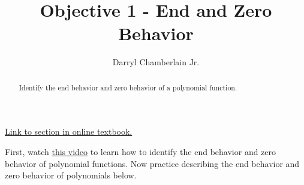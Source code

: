 \documentclass{ximera}
\author{Darryl Chamberlain Jr.}
\title{Objective 1 - End and Zero Behavior}
\begin{document}
\begin{abstract}
Identify the end behavior and zero behavior of a polynomial function.
\end{abstract}
\maketitle

\href{https://cnx.org/contents/mwjClAV_@8.1:ZE9qk3Qp@12/Graphs-of-Polynomial-Functions}{Link to section in online textbook.}


First, watch \underline{\href{https://mediasite.video.ufl.edu/Mediasite/Play/8814f4cd9bc24a2ea1f4cee8e42f09b21d}{this video}} to learn how to identify the end behavior and zero behavior of polynomial functions. Now practice describing the end behavior and zero behavior of polynomials below. 
\end{document}
